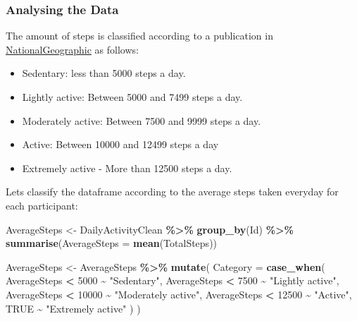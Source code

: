 \documentclass[
]{article}
\newenvironment{Shaded}{\begin{snugshade}}{\end{snugshade}}
\newcommand{\AttributeTok}[1]{\textcolor[rgb]{0.13,0.29,0.53}{#1}}
\newcommand{\ConstantTok}[1]{\textcolor[rgb]{0.56,0.35,0.01}{#1}}
\newcommand{\DecValTok}[1]{\textcolor[rgb]{0.00,0.00,0.81}{#1}}
\newcommand{\FunctionTok}[1]{\textcolor[rgb]{0.13,0.29,0.53}{\textbf{#1}}}
\newcommand{\NormalTok}[1]{#1}
\newcommand{\OtherTok}[1]{\textcolor[rgb]{0.56,0.35,0.01}{#1}}
\newcommand{\SpecialCharTok}[1]{\textcolor[rgb]{0.81,0.36,0.00}{\textbf{#1}}}
\newcommand{\StringTok}[1]{\textcolor[rgb]{0.31,0.60,0.02}{#1}}
\providecommand{\tightlist}{%
  \setlength{\itemsep}{0pt}\setlength{\parskip}{0pt}}
\begin{document}
\subsubsection{Analysing the Data}\label{analysing-the-data}

The amount of steps is classified according to a publication in
\href{https://www.nationalgeographicla.com/ciencia/2024/02/caminar-es-bueno-para-la-salud-cuantos-pasos-debe-dar-una-persona-al-dia}{NationalGeographic}
as follows:

\begin{itemize}
\tightlist
\item
  Sedentary: less than 5000 steps a day.
\item
  Lightly active: Between 5000 and 7499 steps a day.
\item
  Moderately active: Between 7500 and 9999 steps a day.
\item
  Active: Between 10000 and 12499 steps a day
\item
  Extremely active - More than 12500 steps a day.
\end{itemize}

Lets classify the dataframe according to the average steps taken
everyday for each participant:

\begin{Shaded}
\begin{Highlighting}[]
\NormalTok{AverageSteps }\OtherTok{\textless{}{-}}\NormalTok{ DailyActivityClean }\SpecialCharTok{\%\textgreater{}\%}
     \FunctionTok{group\_by}\NormalTok{(Id) }\SpecialCharTok{\%\textgreater{}\%}
     \FunctionTok{summarise}\NormalTok{(}\AttributeTok{AverageSteps =} \FunctionTok{mean}\NormalTok{(TotalSteps))}
\end{Highlighting}
\end{Shaded}

\begin{Shaded}
\begin{Highlighting}[]
\NormalTok{AverageSteps }\OtherTok{\textless{}{-}}\NormalTok{ AverageSteps }\SpecialCharTok{\%\textgreater{}\%}
  \FunctionTok{mutate}\NormalTok{(}
  \AttributeTok{Category =} \FunctionTok{case\_when}\NormalTok{(}
\NormalTok{             AverageSteps }\SpecialCharTok{\textless{}} \DecValTok{5000} \SpecialCharTok{\textasciitilde{}} \StringTok{"Sedentary"}\NormalTok{,}
\NormalTok{             AverageSteps }\SpecialCharTok{\textless{}} \DecValTok{7500} \SpecialCharTok{\textasciitilde{}} \StringTok{"Lightly active"}\NormalTok{,}
\NormalTok{             AverageSteps }\SpecialCharTok{\textless{}} \DecValTok{10000} \SpecialCharTok{\textasciitilde{}} \StringTok{"Moderately active"}\NormalTok{,}
\NormalTok{             AverageSteps }\SpecialCharTok{\textless{}} \DecValTok{12500} \SpecialCharTok{\textasciitilde{}} \StringTok{"Active"}\NormalTok{,}
             \ConstantTok{TRUE} \SpecialCharTok{\textasciitilde{}} \StringTok{"Extremely active"}
\NormalTok{         )}
\NormalTok{     )}
\end{Highlighting}
\end{Shaded}
\end{document}

